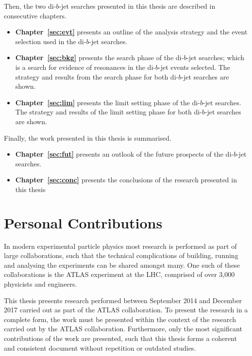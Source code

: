 \noindent
Then, the two di-$b$-jet searches presented in this thesis are described in consecutive chapters. %
\vspace{-2em}
\begin{itemize}[leftmargin=*]
\item\textbf{Chapter~\ref{sec:evt}} presents an outline of the analysis strategy and the event selection used in the \mbox{di-$b$-jet} searches.%
\item\textbf{Chapter~\ref{sec:bkg}} presents the search phase of the di-$b$-jet searches;
  which is a search for evidence of resonances in the di-$b$-jet events selected.
  The strategy and results from the search phase for both di-$b$-jet searches are shown.%
\item\textbf{Chapter~\ref{sec:lim}} presents the limit setting phase of the di-$b$-jet searches.
  The strategy and results of the limit setting phase for both di-$b$-jet searches are shown.%
\end{itemize}

\noindent
Finally, the work presented in this thesis is summarised.
\vspace{-0.5em}
  \begin{itemize}[leftmargin=*]
\item\textbf{Chapter~\ref{sec:fut}} presents an outlook of the future prospects of the di-$b$-jet searches.%
\item\textbf{Chapter~\ref{sec:conc}} presents the conclusions of the research presented in this thesis%
\end{itemize}
\clearpage
\section{Personal Contributions}

In modern experimental particle physics most research is performed as part of large collaborations,
such that the technical complications of building, running and analysing the experiments can be shared amongst many.
One such of these collaborations is the ATLAS experiment at the LHC, comprised of over 3,000 physicists and engineers.

This thesis presents research performed between September 2014 and December 2017 carried out as part of the ATLAS collaboration.
To present the research in a complete form, the work must be presented within the context of the research carried out by the ATLAS collaboration.
Furthermore, only the most significant contributions of the work are presented,
such that this thesis forms a coherent and consistent document without repetition or outdated studies.

